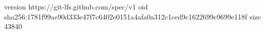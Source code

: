 version https://git-lfs.github.com/spec/v1
oid sha256:1781f99ae90d333e47f7c6402e0151a4afa0a312c1ced9c1622699e9699e118f
size 43840
